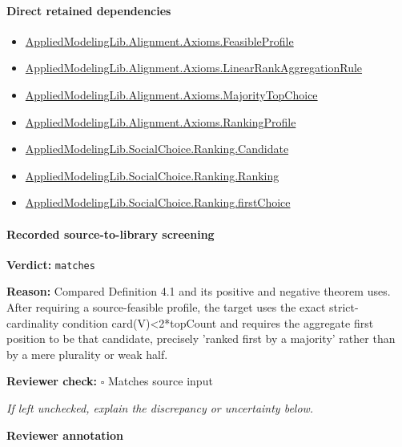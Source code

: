 \documentclass[10pt]{article}
\newcommand{\reviewerbox}{%
  \par\noindent\fbox{\parbox{0.96\linewidth}{\rule{0pt}{0.38in}}}\par
}
\newcommand{\reviewmatch}[1]{%
  \par\noindent\textbf{Reviewer check:} $\square$\; #1\par
  \noindent\emph{If left unchecked, explain the discrepancy or uncertainty below.}\par
}
\begin{document}
\paragraph{Direct retained dependencies}
\begin{itemize}\raggedright
\item \hyperlink{library-prerequisite-5fa7bdb49b050adf}{Applied\allowbreak{}Modeling\allowbreak{}Lib.\allowbreak{}Alignment.\allowbreak{}Axioms.\allowbreak{}Feasible\allowbreak{}Profile}
\item \hyperlink{library-prerequisite-43447e121a1884f9}{Applied\allowbreak{}Modeling\allowbreak{}Lib.\allowbreak{}Alignment.\allowbreak{}Axioms.\allowbreak{}Linear\allowbreak{}Rank\allowbreak{}Aggregation\allowbreak{}Rule}
\item \hyperlink{governing-declaration-b89757167205fd8e}{Applied\allowbreak{}Modeling\allowbreak{}Lib.\allowbreak{}Alignment.\allowbreak{}Axioms.\allowbreak{}Majority\allowbreak{}Top\allowbreak{}Choice}
\item \hyperlink{library-prerequisite-9bded048a60dfe0a}{Applied\allowbreak{}Modeling\allowbreak{}Lib.\allowbreak{}Alignment.\allowbreak{}Axioms.\allowbreak{}Ranking\allowbreak{}Profile}
\item \hyperlink{library-prerequisite-8c0e6c25845ae78a}{Applied\allowbreak{}Modeling\allowbreak{}Lib.\allowbreak{}Social\allowbreak{}Choice.\allowbreak{}Ranking.\allowbreak{}Candidate}
\item \hyperlink{library-prerequisite-5cde54446d1ae021}{Applied\allowbreak{}Modeling\allowbreak{}Lib.\allowbreak{}Social\allowbreak{}Choice.\allowbreak{}Ranking.\allowbreak{}Ranking}
\item \hyperlink{governing-declaration-08e457479ee6cf15}{Applied\allowbreak{}Modeling\allowbreak{}Lib.\allowbreak{}Social\allowbreak{}Choice.\allowbreak{}Ranking.\allowbreak{}first\allowbreak{}Choice}
\end{itemize}
\paragraph{Recorded source-to-library screening}
\textbf{Verdict:} \texttt{matches}
\\
{\raggedright
\textbf{Reason:} Compared Definition 4.\allowbreak{}1 and its positive and negative theorem uses.\allowbreak{} After requiring a source-\allowbreak{}feasible profile, the target uses the exact strict-\allowbreak{}cardinality condition card(V)<2*topCount and requires the aggregate first position to be that candidate, precisely 'ranked first by a majority' rather than by a mere plurality or weak half.\allowbreak{}
\par}
\reviewmatch{Matches source input}
\noindent\textbf{Reviewer annotation}\par
\reviewerbox
\clearpage
\hypertarget{library-prerequisite-e6dee3706881b80a}{}
\end{document}
